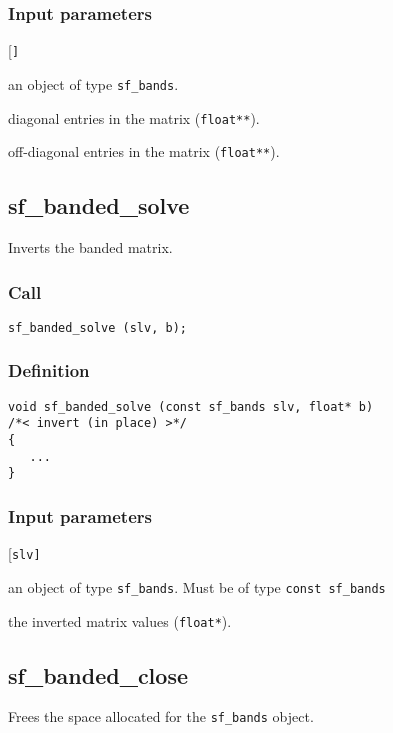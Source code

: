 \subsubsection*{Input parameters}
\begin{desclist}{\tt }{\quad}[\tt ]
   \setlength\itemsep{0pt}
   \item[slv]  an object of type \texttt{sf\_bands}. 
   \item[diag] diagonal entries in the matrix (\texttt{float**}).  
   \item[offd] off-diagonal entries in the matrix (\texttt{float**}).  

\end{desclist}




\subsection{{sf\_banded\_solve}}
Inverts the banded matrix.

\subsubsection*{Call}
\begin{verbatim}sf_banded_solve (slv, b);\end{verbatim}

\subsubsection*{Definition}
\begin{verbatim}
void sf_banded_solve (const sf_bands slv, float* b)
/*< invert (in place) >*/
{
   ...
}
\end{verbatim}

\subsubsection*{Input parameters}
\begin{desclist}{\tt }{\quad}[\tt slv]
   \setlength\itemsep{0pt}
   \item[slv] an object of type \texttt{sf\_bands}. Must be of type \texttt{const sf\_bands}   
   \item[b]   the inverted matrix values (\texttt{float*}).  
\end{desclist}




\subsection{{sf\_banded\_close}}
Frees the space allocated for the \texttt{sf\_bands} object.

